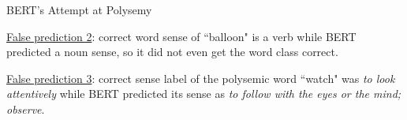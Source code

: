 \begin{frame}{BERT's Attempt at Polysemy}
\begin{itemizeSpaced}{15pt}
\begin{itemizeSpaced}{7pt}
            \item \underline{False prediction 2}: correct word sense of ``balloon" is a verb while BERT predicted a noun sense, so it did not even get the word class correct.
            
            \item \underline{False prediction 3}: correct sense label of the polysemic word ``watch" was \emph{to look attentively} while BERT predicted its sense as \emph{to follow with the eyes or the mind; observe}. 
        \end{itemizeSpaced}
        
    \end{itemizeSpaced}
    
\end{frame}
